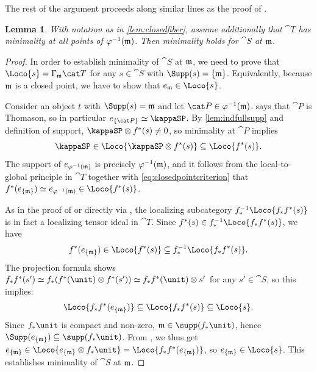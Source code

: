 \documentclass{amsart}%
\numberwithin{equation}{section}%
\newtheorem{Lem}[equation]{Lemma}
\theoremstyle{remark}
\begin{document}
The rest of the argument proceeds along similar lines as the proof of \cite[Thm.~6.4]{bhs1}.

\begin{Lem}\label{lem:closedpointcriterion}
With notation as in \cref{lem:closedfiber}, assume additionally that $\cat T$ has minimality at all points of $\varphi^{-1}(\frak m)$. Then minimality holds for $\cat S$ at $\frak m$.
\end{Lem}
\begin{proof}
In order to establish minimality of $\cat S$ at $\frak m$, we need to prove that $\Loco{s} = \Gamma_{\frak m}\cat T$ for any $s \in \cat S$ with $\Supp(s) = \{\frak m\}$. Equivalently, because $\frak m$ is a closed point, we have to show that $e_{\frak m} \in \Loco{s}$. 

Consider an object $t$ with $\Supp(s) = \frak m$ and let $\cat P \in \varphi^{-1}(\frak m)$.  says that $\cat P$ is Thomason, so in particular $e_{\{\cat P\}} \simeq \kappaSP$. By \cref{lem:indfullsupp} and definition of support, $\kappaSP \otimes f^*(s) \neq 0$, so minimality at $\cat P$ implies
\begin{equation}\label{eq:closedpointcriterion}
\kappaSP \in \Loco{\kappaSP \otimes f^*(s)} \subseteq \Loco{f^*(s)}.
\end{equation}
The support of $e_{\varphi^{-1}(\frak m)}$ is precisely $\varphi^{-1}(\frak m)$, and it follows from the local-to-global principle in $\cat T$ together with \cref{eq:closedpointcriterion} that $f^*(e_{\{\frak m\}}) \simeq e_{\varphi^{-1}(\frak m)} \in \Loco{f^*(s)}$. 

As in the proof of \cite[Thm.~6.4]{bhs1} or directly via \cite[Lem.~3.2]{Balmer16b}, the localizing subcategory $f_*^{-1}\Loco{f_*f^*(s)}$ is in fact a localizing tensor ideal in $\cat T$. Since $f^*(s) \in f_*^{-1}\Loco{f_*f^*(s)}$, we have
\[
f^*(e_{\{\frak m\}}) \in \Loco{f^*(s)} \subseteq f_*^{-1}\Loco{f_*f^*(s)}.
\]
The projection formula shows $f_*f^*(s') \simeq f_*(f^*(\unit) \otimes f^*(s')) \simeq f_*f^*(\unit) \otimes s'$ for any $s' \in \cat S$, so this implies:
\[
\Loco{f_*f^*(e_{\{\frak m\}})} \subseteq \Loco{f_*f^*(s)} \subseteq \Loco{s}.
\]
Since $f_*\unit$ is compact and non-zero, $\frak m \in \supp(f_*\unit)$, hence $\Supp(e_{\{\frak m\}}) \subseteq \supp(f_*\unit)$. From \cite[Lem.~3.7]{bhs1}, we thus get $e_{\{\frak m\}} \in \Loco{e_{\{\frak m\}} \otimes f_*\unit} = \Loco{f_*f^*(e_{\{\frak m\}})}$, so $e_{\{\frak m\}} \in \Loco{s}$. This establishes minimality of $\cat S$ at $\frak m$.
\end{proof}
\end{document}
